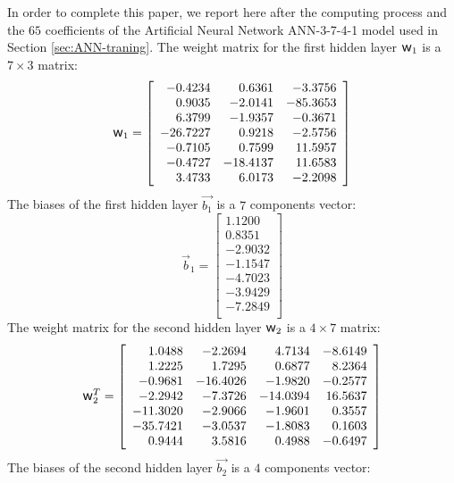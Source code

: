 \documentclass[algorithms,article,submit,pdftex,moreauthors]{Definitions/mdpi}
\DeclareRobustCommand{\w}{\mbox{\large\ensuremath{\mathsf{w}}}}
\begin{document}
In order to complete this paper, we report here after the computing process and the $65$ coefficients of the Artificial Neural Network ANN-3-7-4-1 model used in Section \ref{sec:ANN-traning}.
The weight matrix for the first hidden layer $\w_1$ is a $7\times3$ matrix:
\begin{equation*}
\w_1 = \left[
\begin{array}{rrr}
-0.4234 & 0.6361 & -3.3756\\ 
0.9035 & -2.0141 & -85.3653\\ 
6.3799 & -1.9357 & -0.3671\\ 
-26.7227 & 0.9218 & -2.5756\\ 
-0.7105 & 0.7599 & 11.5957\\ 
-0.4727 & -18.4137 & 11.6583\\ 
3.4733 & 6.0173 & -2.2098\\ 
\end{array}\right]
\end{equation*}
The biases of the first hidden layer $\overrightarrow{b_1}$ is a $7$ components vector:
\begin{equation*}
\overrightarrow{b}_1 = \left[
\begin{array}{r}
1.1200\\ 
0.8351\\ 
-2.9032\\ 
-1.1547\\ 
-4.7023\\ 
-3.9429\\ 
-7.2849\\ 
\end{array}\right]
\end{equation*}
The weight matrix for the second hidden layer $\w_2$ is a $4\times7$ matrix:
\begin{equation*}
\w_2^T = \left[
\begin{array}{rrrr}
1.0488 & -2.2694 & 4.7134 & -8.6149\\ 
1.2225 & 1.7295 & 0.6877 & 8.2364\\ 
-0.9681 & -16.4026 & -1.9820 & -0.2577\\ 
-2.2942 & -7.3726 & -14.0394 & 16.5637\\ 
-11.3020 & -2.9066 & -1.9601 & 0.3557\\ 
-35.7421 & -3.0537 & -1.8083 & 0.1603\\ 
0.9444 & 3.5816 & 0.4988 & -0.6497\\ 
\end{array}\right]
\end{equation*}
The biases of the second hidden layer $\overrightarrow{b_2}$ is a $4$ components vector:
\end{document}
